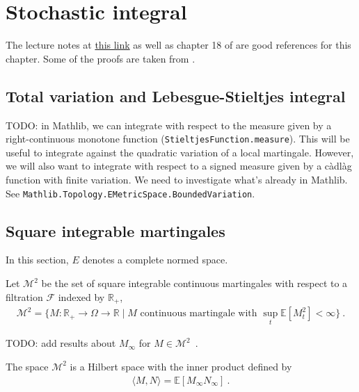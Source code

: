 \chapter{Stochastic integral}

The lecture notes at \href{https://dec41.user.srcf.net/h/III_L/stochastic_calculus_and_applications/}{this link} as well as chapter 18 of \cite{kallenberg2021} are good references for this chapter.
Some of the proofs are taken from \cite{pascucci2024}.

\section{Total variation and Lebesgue-Stieltjes integral}

TODO: in Mathlib, we can integrate with respect to the measure given by a right-continuous monotone function (\texttt{StieltjesFunction.measure}). This will be useful to integrate against the quadratic variation of a local martingale.
However, we will also want to integrate with respect to a signed measure given by a càdlàg function with finite variation.
We need to investigate what's already in Mathlib. See \texttt{Mathlib.Topology.EMetricSpace.BoundedVariation}.

\section{Square integrable martingales}

In this section, $E$ denotes a complete normed space.

\begin{definition}\label{def:squareIntegrableMartingales}
Let $\mathcal{M}^2$ be the set of square integrable continuous martingales with respect to a filtration $\mathcal{F}$ indexed by $\mathbb{R}_+$,
\begin{align*}
  \mathcal{M}^2
  = \{ M : \mathbb{R}_+ \to \Omega \to \mathbb{R} \mid M \text{ continuous martingale with } \sup_{t}\mathbb{E}[M_t^2] < \infty \}
  \: .
\end{align*}
\end{definition}

TODO: add results about $M_\infty$ for $M \in \mathcal{M}^2$~.

\begin{theorem}\label{thm:hilbertSpace_squareIntegrableMartingales}
The space $\mathcal{M}^2$ is a Hilbert space with the inner product defined by
\begin{align*}
  \langle M, N \rangle = \mathbb{E}[M_\infty N_\infty]
  \: .
\end{align*}
\end{theorem}

